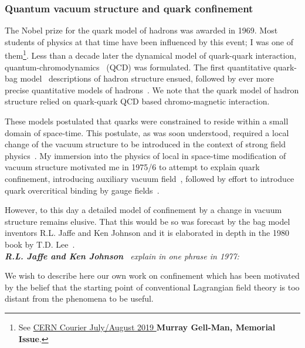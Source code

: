 \subsubsection{Quantum vacuum structure and quark confinement}\label{subsec:quarkQCD}

The Nobel prize for the quark model of hadrons was awarded in 1969. Most students of physics at that time have been influenced by this event; I was one of them\footnote{See 
\href{http://iopp.fileburst.com/ccr/archive/CERNCourier2019JulAug-digitaledition.pdf}{CERN Courier July/August 2019 } \textbf{Murray Gell-Man, Memorial Issue}.}. Less than a decade later the dynamical model of quark-quark interaction, quantum-chromodynamics~\cite{Fritzsch:1973pi} (QCD) was formulated. The first quantitative quark-bag model~\cite{Chodos:1974je,Chodos:1974pn,DeGrand:1975cf} descriptions of hadron structure ensued, followed by ever more precise quantitative models of hadrons~\cite{Thomas:1981vc,Thomas:1982kv}. We note that the quark model of hadron structure relied on quark-quark QCD based chromo-magnetic interaction.

These models postulated that quarks were constrained to reside within a small domain of space-time. This postulate, as was soon understood, required a local change of the vacuum structure to be introduced in the context of strong field physics~\cite{Rafelski:1974rh}. My immersion into the physics of local in space-time modification of vacuum structure motivated me in 1975/6 to attempt to explain quark confinement, introducing auxiliary vacuum field~\cite{Rafelski:1975ra}, followed by effort to introduce quark overcritical binding by gauge fields~\cite{Muller:1976ms}.

However, to this day a detailed model of confinement by a change in vacuum structure remains elusive. That this would be so was forecast by the bag model inventors\cite{Jaffe:1977su} R.L. Jaffe and Ken Johnson and it is elaborated in depth in the 1980 book by T.D. Lee~\cite{Lee:1980book}.\\

\noindent\textit{\textbf{R.L. Jaffe and Ken Johnson}~\cite{Jaffe:1977su} explain in one phrase in 1977:}\\[-0.7cm]
%
\begin{mdframed}[linecolor=gray,roundcorner=12pt,backgroundcolor=GreenYellow!15,linewidth=1pt,leftmargin=0cm,rightmargin=0cm,topline=true,bottomline=true,skipabove=12pt]\relax%
% 
\label{JaJo}
We wish to describe here our own work on confinement which has been motivated by the belief that the starting point of conventional Lagrangian field theory is too distant from the phenomena to be useful.
\end{mdframed}
\vskip 0.5cm 

